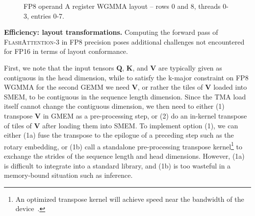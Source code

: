 \begin{figure}
\centering
{}
\caption{FP8 operand A register WGMMA layout -- rows 0 and 8, threads 0-3, entries 0-7.}
\label{fig:rmem_operand}
\end{figure}

\textbf{Efficiency: layout transformations.} Computing the forward pass of \textsc{FlashAttention-3} in FP8 precision poses additional challenges not encountered for FP16 in terms of layout conformance.

First, we note that the input tensors $\mathbf{Q}$, $\mathbf{K}$, and $\mathbf{V}$
are typically given as contiguous in the head dimension, while to satisfy the k-major constraint on FP8 WGMMA for the second GEMM we need $\mathbf{V}$,
or rather the tiles of $\mathbf{V}$ loaded into SMEM, to be contiguous in the sequence length dimension. Since the TMA load itself cannot change the contiguous dimension, we then need to either (1) transpose $\mathbf{V}$ in GMEM as a pre-processing step, or (2) do an in-kernel transpose of tiles of $\mathbf{V}$ after loading them into SMEM. To implement option (1), we can either (1a) fuse the transpose to the epilogue of a preceding step such as the rotary embedding, or (1b) call a standalone pre-processing transpose
kernel\footnote{An optimized transpose kernel will achieve speed near the bandwidth of the device~\citep{colfax_cutlass_transpose_2024}.} to exchange the strides of the sequence length and head dimensions. However, (1a) is difficult to integrate into a standard library, and (1b) is too wasteful in a memory-bound situation such as inference.

